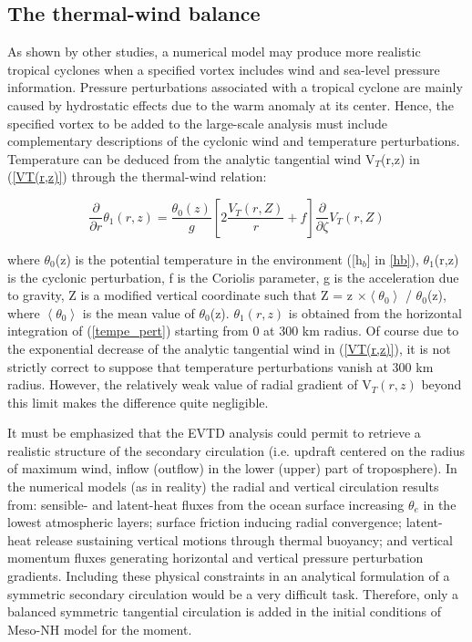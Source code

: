 \subsection{The thermal-wind balance}

As shown by other studies, a numerical model may produce more realistic tropical 
cyclones when a specified vortex includes wind and sea-level pressure information. 
Pressure perturbations associated with a tropical cyclone are mainly caused by 
hydrostatic effects due to the warm anomaly at its center. Hence, the specified 
vortex to be added to the large-scale analysis must include complementary descriptions 
of the cyclonic wind and temperature perturbations. Temperature can be deduced from 
the analytic tangential wind V$_{T}$(r,z) in (\ref{VT(r,z)}) through the thermal-wind 
relation:

\begin{equation}
\frac{\partial}{\partial r}\theta_{1}(r,z)=\frac{\theta_{0}(z)}{g}\left[2\frac{V_{T}(r,Z)}{r}+f\right]\frac{\partial}{\partial\zeta}V_{T}(r,Z) 
\label{tempe_pert}
\end{equation}

where $\theta_{0}$(z) is the potential temperature in the environment ([h$_{b}$] in 
\ref{hb}), $\theta_{1}$(r,z) is the cyclonic perturbation, f is the Coriolis parameter, g is the acceleration due to gravity, Z is a modified vertical coordinate 
such that Z = z $\times\left\langle\theta_{0}\right\rangle$ / $\theta_{0}$(z), where 
$\left\langle\theta_{0}\right\rangle$ is the mean value of $\theta_{0}$(z). $\theta_{1}(r,z)$ is obtained from the horizontal integration of (\ref{tempe_pert}) 
starting from 0 at 300 km radius. Of course due to the exponential decrease of the 
analytic tangential wind in (\ref{VT(r,z)}), it is not strictly correct to suppose that 
temperature perturbations vanish at 300 km radius. However, the relatively weak value 
of radial gradient of V$_{T}(r,z)$ beyond this limit makes the difference quite negligible.

It must be emphasized that the EVTD analysis could permit to retrieve a realistic structure of the secondary circulation (i.e. updraft centered on the radius of maximum wind, inflow (outflow) in the lower (upper) part of troposphere). In the 
numerical models (as in reality) the radial and vertical circulation results from: 
sensible- and latent-heat fluxes from the ocean surface increasing $\theta_{e}$ in 
the lowest atmospheric layers; surface friction inducing radial convergence; 
latent-heat release sustaining vertical motions through thermal buoyancy; and 
vertical momentum fluxes generating horizontal and vertical pressure perturbation 
gradients. Including these physical constraints in an analytical formulation of a 
symmetric secondary circulation would be a very difficult task. Therefore, only a balanced symmetric tangential circulation is added in the initial conditions 
of Meso-NH model for the moment.

